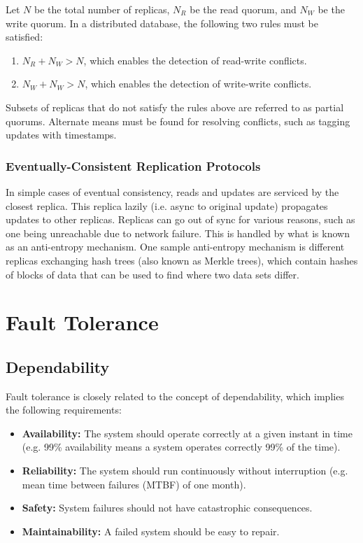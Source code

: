 \documentclass[12pt,titlepage]{article}
\let\stdsection\section
\renewcommand\section{\clearpage\stdsection}
\begin{document}
        Let $N$ be the total number of replicas, $N_R$ be the read quorum, and $N_W$ be the write quorum. In a distributed database, the following two rules must
        be satisfied:
        \begin{enumerate}
          \item $N_R + N_W > N$, which enables the detection of read-write conflicts.
          \item $N_W + N_W > N$, which enables the detection of write-write conflicts.
        \end{enumerate}

        Subsets of replicas that do not satisfy the rules above are referred to as partial quorums. Alternate means must be found for resolving conflicts, such
        as tagging updates with timestamps.

      \subsubsection{Eventually-Consistent Replication Protocols}
        In simple cases of eventual consistency, reads and updates are serviced by the closest replica. This replica lazily (i.e. async to original update) propagates
        updates to other replicas. Replicas can go out of sync for various reasons, such as one being unreachable due to network failure. This is handled by what is
        known as an anti-entropy mechanism. One sample anti-entropy mechanism is different replicas exchanging hash trees (also known as Merkle trees), which contain
        hashes of blocks of data that can be used to find where two data sets differ.

  \section{Fault Tolerance}

    \subsection{Dependability}
      Fault tolerance is closely related to the concept of dependability, which implies the following requirements:
      \begin{itemize}
        \item \textbf{Availability:} The system should operate correctly at a given instant in time (e.g. 99\% availability means a system operates
          correctly 99\% of the time).
        \item \textbf{Reliability:} The system should run continuously without interruption (e.g. mean time between failures (MTBF) of one month).
        \item \textbf{Safety:} System failures should not have catastrophic consequences.
        \item \textbf{Maintainability:} A failed system should be easy to repair.
      \end{itemize}
\end{document}
